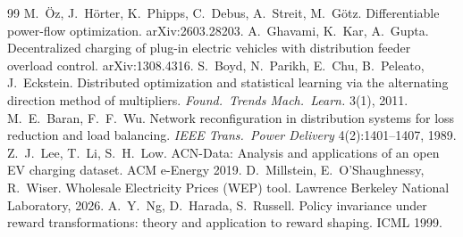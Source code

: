 \documentclass[10pt]{article}
\begin{document}
\begin{thebibliography}{99}
 M.~\"Oz, J.~H\"orter, K.~Phipps, C.~Debus, A.~Streit, M.~G\"otz. Differentiable power-flow optimization. arXiv:2603.28203.
 A.~Ghavami, K.~Kar, A.~Gupta. Decentralized charging of plug-in electric vehicles with distribution feeder overload control. arXiv:1308.4316.
 S.~Boyd, N.~Parikh, E.~Chu, B.~Peleato, J.~Eckstein. Distributed optimization and statistical learning via the alternating direction method of multipliers. \emph{Found.\ Trends Mach.\ Learn.} 3(1), 2011.
 M.~E.~Baran, F.~F.~Wu. Network reconfiguration in distribution systems for loss reduction and load balancing. \emph{IEEE Trans.\ Power Delivery} 4(2):1401--1407, 1989.
 Z.~J.~Lee, T.~Li, S.~H.~Low. ACN-Data: Analysis and applications of an open EV charging dataset. ACM e-Energy 2019.
 D.~Millstein, E.~O'Shaughnessy, R.~Wiser. Wholesale Electricity Prices (WEP) tool. Lawrence Berkeley National Laboratory, 2026.
 A.~Y.~Ng, D.~Harada, S.~Russell. Policy invariance under reward transformations: theory and application to reward shaping. ICML 1999.
\end{thebibliography}
\end{document}
